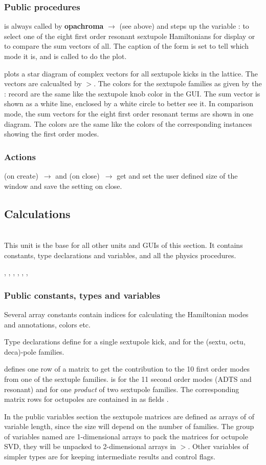 \documentclass[12pt]{article}
\newcommand\code[1]{{\tt #1}}
\newcommand{\ofld}[1]{\colorbox{black!15}{{{\color{black}\bf #1}}}}
\newcommand{\ofldx}[1]{\colorbox{black!15}{{\color{black}(#1)}}}
\newcommand\guico[1]{{\color{blue}\code{#1}}}
\newcommand\guifco[1]{{\color{violet}\code{#1}}}
\newcommand{\unico}[1]{{\color{burntorange}\code{#1}}}
\newcommand{\evcod}[2]{\ofld{#1} $\rightarrow$ \guico{#2}}
\newcommand{\evcodxf}[2]{\ofldx{#1}~$\rightarrow$ \guifco{#2}}
\newcommand{\prcod}[2]{\opauni{#1}$>$\unico{#2}}
\newcommand{\vrcod}[2]{\opauni{#1}:\unico{#2}}
\newcommand{\opagui}[1]{\colorbox{blue!20}{{\color{black}\code{#1}}}}
\newcommand{\ogui}[1]{\hyperref[#1]{\opagui{#1}}}
\newcommand{\opaguif}[1]{\colorbox{violet!30}{{\color{black}\code{#1}}}}
\newcommand{\oguif}[1]{\hyperref[#1]{\opaguif{#1}}}
\newcommand{\opauni}[1]{\colorbox{orange!30}{{\color{black}\code{#1}}}}
\newcommand{\ounih}[2]{\subsection{\label{#2}#1}{\Huge\opauni{#2}}\\}
\newcommand{\ouni}[1]{\hyperref[#1]{\opauni{#1}}}
\newcommand{\uses}[1]{\flushleft {\bf Uses:} #1}
\newcommand{\desc}[1]{#1}
\newcommand{\act}[1]{\subsubsection*{Actions} #1}
\newcommand{\pvar}[1]{\subsubsection*{Public constants, types and variables} #1}
\newcommand{\ppro}[1]{\subsubsection*{Public procedures} #1}
\begin{document}
\ppro{
\guico{Init} is always called by \evcod{opachroma}{butSelectClick} (see above) and steps up the variable \vrcod{chromlib}{VSelect} to select one of the eight first order resonant sextupole Hamiltonians for display or to compare the sum vectors of all. The caption of the form is set to tell which mode it is, and \guico{Star} is called to do the plot.

\guico{Star} plots a star diagram of complex vectors for all sextupole kicks in the lattice. The vectors are calcualted by \prcod{chromlib}{getSVector}. The colors for the sextupole families as given by the \vrcod{chromlib}{SexFam} record are the same like the sextupole knob \oguif{csexframe} color in the \ogui{opachroma} GUI. The sum vector is shown as a white line, enclosed by a white circle to better see it. In comparison mode, the sum vectors for the eight first order resonant terms are shown in one diagram. The colors are the same like the colors of the corresponding \oguif{chamframe} instances showing the first order modes.
}

\act{
\evcodxf{on create}{FormCreate} and \evcodxf{on close}{FormClose} get and set the user defined size of the window and save the setting on close.
}


\ounih{Calculations}{chromlib} 

\desc{This unit is the base for all other units and GUIs of this section. It contains constants, type declarations and variables, and all the physics procedures.}

\uses{
\ouni{linoplib}, \ouni{elemlib}, \ogui{opatunediag}, \ouni{globlib}, \ouni{mathlib}, \ouni{comvgraphlib}, \ouni{comauxlib}
}


\pvar{
Several array constants contain indices for calculating the Hamiltonian modes and annotations, colors etc.

Type declarations define \unico{SextupoleType} for a single sextupole kick, and \unico{(Sex, Octu, Deca) FamType} for the (sextu, octu, deca)-pole families. 

\unico{SM1\_row} defines one row of a matrix to get the contribution to the 10 first order modes from one of the sextuple families. \unico{SM2\_row} is for the 11 second order modes (ADTS and resonant) and for one {\em product} of two sextupole families. The corresponding matrix rows for octupoles are contained in \unico{OctuFamType} as fields \unico{omat, om1}.

In the public variables section the sextupole matrices \unico{SM1, SM2} are defined as arrays of \unico{SM(1,2)\_row} of variable length, since the size will depend on the number of families. The group of variables named \unico{osvd\_\dots} are 1-dimensional arrays to pack the matrices for octupole SVD, they will be unpacked to 2-dimensional arrays in \prcod{mathlib}{SVDCMP}. Other variables of simpler types are for keeping intermediate results and control flags.
}
\end{document}

